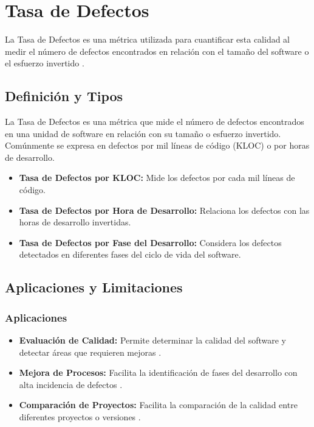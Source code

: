 \documentclass[a4,10pt]{article}
\begin{document}
\section{Tasa de Defectos}
\hspace{0.6cm}La Tasa de Defectos es una métrica utilizada para cuantificar esta calidad al medir el número de defectos encontrados en relación con el tamaño del software o el esfuerzo invertido \cite{Farid2021, Akimova2021, Haldar2024}.

\subsection{Definición y Tipos}
\hspace{0.6cm}La Tasa de Defectos es una métrica que mide el número de defectos encontrados en una unidad de software en relación con su tamaño o esfuerzo invertido. Comúnmente se expresa en defectos por mil líneas de código (KLOC) o por horas de desarrollo.
\begin{itemize}
    \item \textbf{Tasa de Defectos por KLOC:} Mide los defectos por cada mil líneas de código.
    \item \textbf{Tasa de Defectos por Hora de Desarrollo:} Relaciona los defectos con las horas de desarrollo invertidas.
    \item \textbf{Tasa de Defectos por Fase del Desarrollo:} Considera los defectos detectados en diferentes fases del ciclo de vida del software.
\end{itemize}

\subsection{Aplicaciones y Limitaciones}
\subsubsection{Aplicaciones}
\begin{itemize}
    \item \textbf{Evaluación de Calidad:} Permite determinar la calidad del software y detectar áreas que requieren mejoras \cite{Farid2021}.
    \item \textbf{Mejora de Procesos:} Facilita la identificación de fases del desarrollo con alta incidencia de defectos \cite{Akimova2021}.
    \item \textbf{Comparación de Proyectos:} Facilita la comparación de la calidad entre diferentes proyectos o versiones \cite{Haldar2024}.
\end{itemize}
\end{document}
